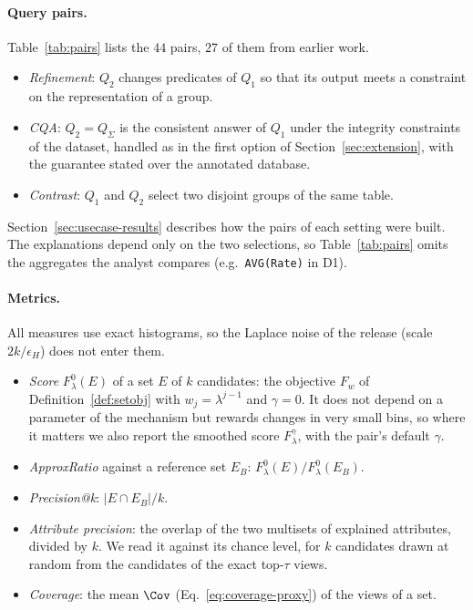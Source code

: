 \paragraph{Query pairs.}
Table~\ref{tab:pairs} lists the $44$ pairs, $27$ of them from earlier work.
\begin{itemize}[leftmargin=*,itemsep=1pt,topsep=2pt]
  \item \emph{Refinement}: $Q_2$ changes predicates of $Q_1$ so that its output meets a constraint on the representation of a group.
  \item \emph{CQA}: $Q_2=Q_\Sigma$ is the consistent answer of $Q_1$ under the integrity constraints of the dataset, handled as in the first option of Section~\ref{sec:extension}, with the guarantee stated over the annotated database.
  \item \emph{Contrast}: $Q_1$ and $Q_2$ select two disjoint groups of the same table.
\end{itemize}
Section~\ref{sec:usecase-results} describes how the pairs of each setting were built.
The explanations depend only on the two selections, so Table~\ref{tab:pairs} omits the aggregates the analyst compares (e.g.\ \texttt{AVG(Rate)} in D1).



\paragraph{Metrics.}
All measures use exact histograms, so the Laplace noise of the release (scale $2k/\epsilon_H$) does not enter them.
\begin{itemize}[leftmargin=*,itemsep=1pt,topsep=2pt]
  \item \emph{Score} $F^0_\lambda(E)$ of a set $E$ of $k$ candidates: the objective $F_w$ of Definition~\ref{def:setobj} with $w_j=\lambda^{j-1}$ and $\gamma=0$. It does not depend on a parameter of the mechanism but rewards changes in very small bins, so where it matters we also report the smoothed score $F^\gamma_\lambda$, with the pair's default $\gamma$.
  \item \emph{ApproxRatio} against a reference set $E_B$: $F^0_\lambda(E)/F^0_\lambda(E_B)$.
  \item \emph{Precision@k}: $|E\cap E_B|/k$.
  \item \emph{Attribute precision}: the overlap of the two multisets of explained attributes, divided by $k$. We read it against its chance level, for $k$ candidates drawn at random from the candidates of the exact top-$\tau$ views.
  \item \emph{Coverage}: the mean $\Cov$ (Eq.~\eqref{eq:coverage-proxy}) of the views of a set.
\end{itemize}


